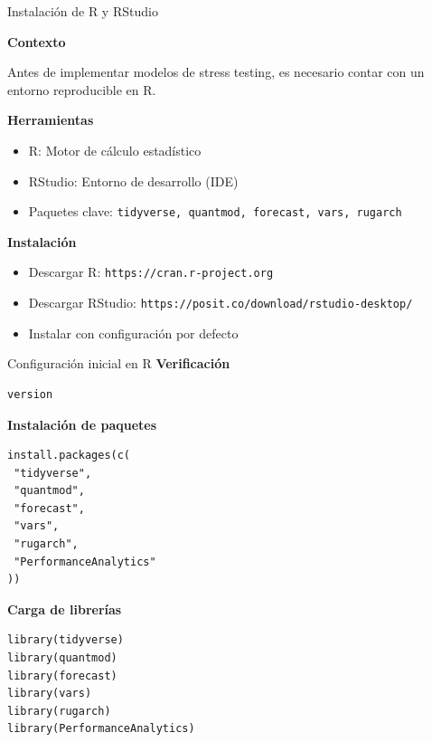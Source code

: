 \documentclass[10pt]{beamer}
\begin{document}
\begin{frame}{Instalación de R y RStudio}

\textbf{Contexto}

\vspace{0.2cm}
Antes de implementar modelos de stress testing, es necesario contar con un entorno reproducible en R.

\vspace{0.4cm}

\textbf{Herramientas}
\begin{itemize}
\item R: Motor de cálculo estadístico
\item RStudio: Entorno de desarrollo (IDE)
\item Paquetes clave: \texttt{tidyverse, quantmod, forecast, vars, rugarch}
\end{itemize}

\vspace{0.4cm}

\textbf{Instalación}
\begin{itemize}
\item Descargar R: \texttt{https://cran.r-project.org}
\item Descargar RStudio: \texttt{https://posit.co/download/rstudio-desktop/}
\item Instalar con configuración por defecto
\end{itemize}

\end{frame}


\begin{frame}[fragile]{Configuración inicial en R}
\footnotesize
\textbf{Verificación}

\begin{lstlisting}
version
\end{lstlisting}

\vspace{0.3cm}

\textbf{Instalación de paquetes}

\begin{lstlisting}
install.packages(c(
 "tidyverse",
 "quantmod",
 "forecast",
 "vars",
 "rugarch",
 "PerformanceAnalytics"
))
\end{lstlisting}


\textbf{Carga de librerías}

\begin{lstlisting}
library(tidyverse)
library(quantmod)
library(forecast)
library(vars)
library(rugarch)
library(PerformanceAnalytics)
\end{lstlisting}

\end{frame}
\end{document}
